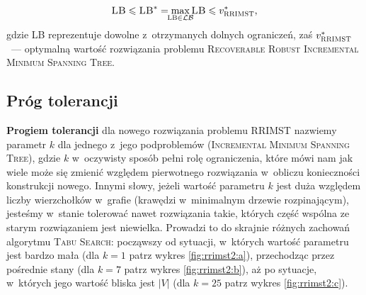 \begin{equation}
	\textsc{LB} \leqslant \textsc{LB}^{\ast} = \max_{\mathclap{\textsc{LB} \in \mathcal{LB}}} \textsc{LB} \leqslant v_{\textsc{RRIMST}}^{\ast}\text{,}
\end{equation}
gdzie \textsc{LB} reprezentuje dowolne z~otrzymanych dolnych ograniczeń, zaś $v_{\textsc{RRIMST}}^{\ast}$~--- optymalną wartość rozwiązania problemu \textsc{Recoverable Robust Incremental Minimum Spanning Tree}.



\subsection{Próg tolerancji}



\textbf{Progiem tolerancji} dla nowego rozwiązania problemu \textsc{RRIMST} nazwiemy parametr $k$ dla jednego z~jego podproblemów (\textsc{Incremental Minimum Spanning Tree}), gdzie $k$ w~oczywisty sposób pełni rolę ograniczenia, które mówi nam jak wiele może się zmienić względem pierwotnego rozwiązania w~obliczu konieczności konstrukcji nowego.
Innymi słowy, jeżeli wartość parametru $k$ jest duża względem liczby wierzchołków w~grafie (krawędzi w~minimalnym drzewie rozpinającym), jesteśmy w~stanie tolerować nawet rozwiązania takie, których część wspólna ze starym rozwiązaniem jest niewielka.
Prowadzi to do skrajnie różnych zachowań algorytmu \textsc{Tabu Search}: począwszy od sytuacji, w~których wartość parametru jest bardzo mała (dla $k = 1$ patrz wykres \ref{fig:rrimst2:a}), przechodząc przez pośrednie stany (dla $k = 7$ patrz wykres \ref{fig:rrimst2:b}), aż po sytuacje, w~których jego wartość bliska jest $\left| V \right|$ (dla $k = 25$ patrz wykres \ref{fig:rrimst2:c}).

